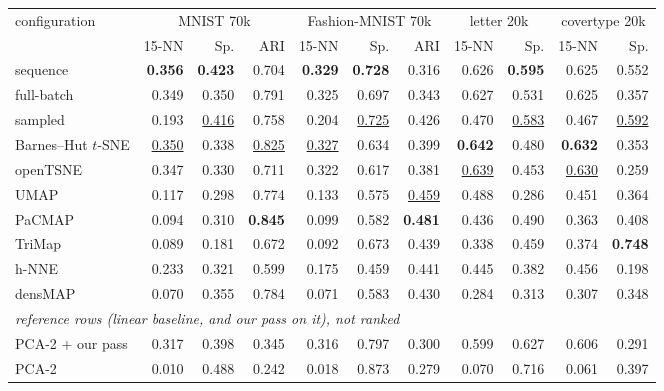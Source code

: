 \begin{tabular}{lrrrrrrrrrr}
\toprule
configuration & \multicolumn{3}{c}{MNIST 70k} & \multicolumn{3}{c}{Fashion-MNIST 70k} & \multicolumn{2}{c}{letter 20k} & \multicolumn{2}{c}{covertype 20k} \\
 & 15-NN & Sp. & ARI & 15-NN & Sp. & ARI & 15-NN & Sp. & 15-NN & Sp. \\
\midrule
\magnet{} sequence & \textbf{0.356} & \textbf{0.423} & 0.704 & \textbf{0.329} & \textbf{0.728} & 0.316 & 0.626 & \textbf{0.595} & 0.625 & 0.552 \\
\magnet{} full-batch & 0.349 & 0.350 & 0.791 & 0.325 & 0.697 & 0.343 & 0.627 & 0.531 & 0.625 & 0.357 \\
\magnet{} sampled & 0.193 & \underline{0.416} & 0.758 & 0.204 & \underline{0.725} & 0.426 & 0.470 & \underline{0.583} & 0.467 & \underline{0.592} \\
Barnes--Hut $t$-SNE & \underline{0.350} & 0.338 & \underline{0.825} & \underline{0.327} & 0.634 & 0.399 & \textbf{0.642} & 0.480 & \textbf{0.632} & 0.353 \\
openTSNE & 0.347 & 0.330 & 0.711 & 0.322 & 0.617 & 0.381 & \underline{0.639} & 0.453 & \underline{0.630} & 0.259 \\
UMAP & 0.117 & 0.298 & 0.774 & 0.133 & 0.575 & \underline{0.459} & 0.488 & 0.286 & 0.451 & 0.364 \\
PaCMAP & 0.094 & 0.310 & \textbf{0.845} & 0.099 & 0.582 & \textbf{0.481} & 0.436 & 0.490 & 0.363 & 0.408 \\
TriMap & 0.089 & 0.181 & 0.672 & 0.092 & 0.673 & 0.439 & 0.338 & 0.459 & 0.374 & \textbf{0.748} \\
h-NNE & 0.233 & 0.321 & 0.599 & 0.175 & 0.459 & 0.441 & 0.445 & 0.382 & 0.456 & 0.198 \\
densMAP & 0.070 & 0.355 & 0.784 & 0.071 & 0.583 & 0.430 & 0.284 & 0.313 & 0.307 & 0.348 \\
\midrule
\multicolumn{11}{l}{\emph{reference rows (linear baseline, and our pass on it), not ranked}} \\
PCA-2 + our pass & 0.317 & 0.398 & 0.345 & 0.316 & 0.797 & 0.300 & 0.599 & 0.627 & 0.606 & 0.291 \\
PCA-2 & 0.010 & 0.488 & 0.242 & 0.018 & 0.873 & 0.279 & 0.070 & 0.716 & 0.061 & 0.397 \\
\bottomrule
\end{tabular}

